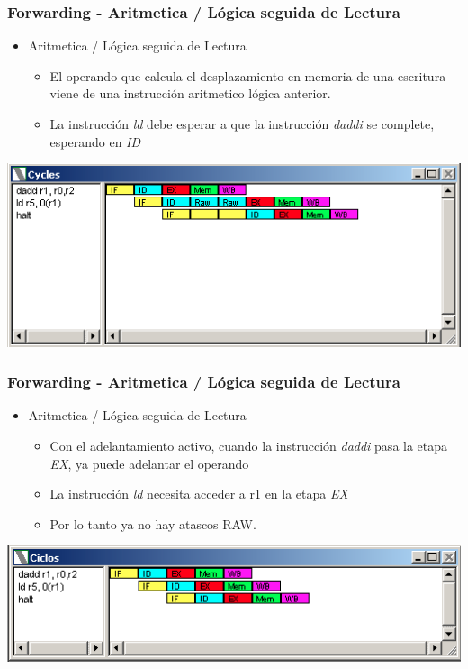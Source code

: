\documentclass{beamer}
\begin{document}
\begin{frame}[fragile]
\frametitle{Forwarding - Aritmetica / Lógica seguida de Lectura}
\begin{itemize}
\item Aritmetica / Lógica seguida de Lectura
\begin{itemize}
\item El operando que calcula el desplazamiento en memoria de una escritura viene de una instrucción aritmetico lógica anterior.
\item La instrucción \emph{ld} debe esperar a que la instrucción \emph{daddi} se complete, esperando en \emph{ID}
\end{itemize}
\end{itemize}
\includegraphics[scale=0.45]{forwarding-8.png}
\end{frame}

\begin{frame}[fragile]
\frametitle{Forwarding - Aritmetica / Lógica seguida de Lectura}
\begin{itemize}
\item Aritmetica / Lógica seguida de Lectura
\begin{itemize}
\item Con el adelantamiento activo, cuando la instrucción \emph{daddi} pasa la etapa \emph{EX}, ya puede adelantar el operando
\item La instrucción \emph{ld} necesita acceder a r1 en la etapa \emph{EX}
\item Por lo tanto ya no hay atascos RAW.
\end{itemize}
\end{itemize}
\includegraphics[scale=0.45]{forwarding-8-aritmetica-lectura.png}
\end{frame}
\end{document}
